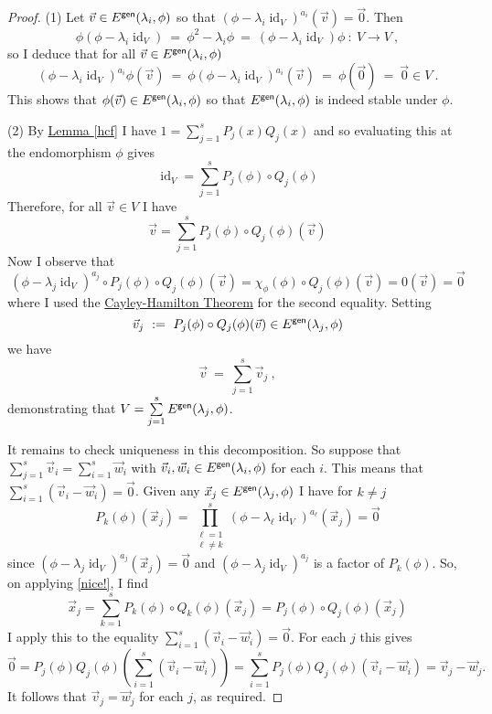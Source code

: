 \documentclass[11pt]{amsbook}
\DeclareMathOperator{\id}{\mathrm{id}}
\theoremstyle{definition}
\begin{document}
\begin{proof}
(1) Let $\vec{v} \in E^{\sf gen}(\lambda_i ,\phi)$ so that $(\phi-\lambda_i\id_V)^{a_i} (\vec{v}) = \vec{0}$. Then  $$\phi(\phi-\lambda_i \id_V)~ =~ \phi^2 - \lambda_i \phi ~=~ (\phi-\lambda_i \id_V)\phi~:~V \to V~,$$
 so I deduce that for all $\vec{v} \in E^{\sf gen}(\lambda_i,\phi)$
 $$(\phi-\lambda_i\id_V)^{a_i} \phi (\vec{v})~ =~ \phi (\phi-\lambda_i\id_V)^{a_i} (\vec{v})~ = ~\phi (\vec{0})~ =~ \vec{0} \in V~.$$ This shows that $\phi(\vec{v}) \in E^{\sf gen}(\lambda_i, \phi)$ so that $E^{\sf gen}(\lambda_i , \phi)$ is indeed stable under $\phi$.

(2) By \hyperref[hcf]{Lemma \ref{hcf}} I have $1 = \sum_{j=1}^s P_j(x)Q_j(x)$ and so evaluating this at the endomorphism $\phi$ gives \begin{equation} \label{nice!} \id_V = \sum_{j=1}^s P_j(\phi)\circ Q_j(\phi)\end{equation} Therefore, for all $\vec{v}\in V$ I have $$\vec{v} = \sum_{j=1}^s P_j(\phi)\circ Q_j(\phi)(\vec{v})$$ Now I observe that $$(\phi-\lambda_j\id_V)^{a_j} \circ P_j(\phi)\circ Q_j(\phi) (\vec{v}) = \chi_\phi(\phi)\circ Q_j(\phi) (\vec{v}) = 0(\vec{v}) = \vec{0}$$ where I used the \hyperref[CHthm]{Cayley-Hamilton Theorem} for the second equality. Setting
$$\vec{v}_j~ :=~  P_j(\phi)\circ Q_j(\phi) (\vec{v}) \in E^{\sf gen}(\lambda_j, \phi)$$
we have $$\vec{v}~ =~ \sum_{j=1}^s \vec{v}_j~,$$
demonstrating that $V = \sum\limits_{j=1}^s E^{\sf gen}(\lambda_j, \phi)$.

It remains to check uniqueness in this decomposition. So suppose that $\sum_{j=1}^s \vec{v}_i = \sum_{i=1}^s \vec{w}_i$ with $\vec{v}_i, \vec{w}_i \in E^{\sf gen}(\lambda_i, \phi)$ for each $i$. This means that $\sum_{i=1}^s (\vec{v}_i - \vec{w}_i) = \vec{0}$. Given any $\vec{x}_j\in E^{\sf gen}(\lambda_j, \phi)$ I have for $k\neq j$ $$P_k(\phi) (\vec{x}_j) = \prod_{\substack{\ell=1 \\ \ell \neq k}}^s (\phi- \lambda_\ell\id_V )^{a_\ell} (\vec{x}_j) = \vec{0}$$ since $(\phi-\lambda_j\id_V)^{a_j}(\vec{x}_j) = \vec{0}$ and $(\phi-\lambda_j\id_V)^{a_j}$ is a factor of $P_k(\phi)$. So, on applying \eqref{nice!}, I find $$\vec{x}_j = \sum_{k=1}^s P_k(\phi)\circ Q_k(\phi) (\vec{x}_j) = P_j(\phi)\circ Q_j(\phi) (\vec{x}_j)$$
I apply this to the equality $\sum_{i=1}^s (\vec{v}_i - \vec{w}_i) = \vec{0}$. For each $j$ this gives $$\vec{0} = P_j(\phi)Q_j(\phi) \left(\sum_{i=1}^s (\vec{v}_i - \vec{w}_i)\right) = \sum_{i=1}^s P_j(\phi)Q_j(\phi) (\vec{v}_i - \vec{w}_i) = \vec{v}_j - \vec{w}_j.$$ It follows that $\vec{v}_j = \vec{w}_j$ for each $j$, as required.


\end{proof}
\end{document}
